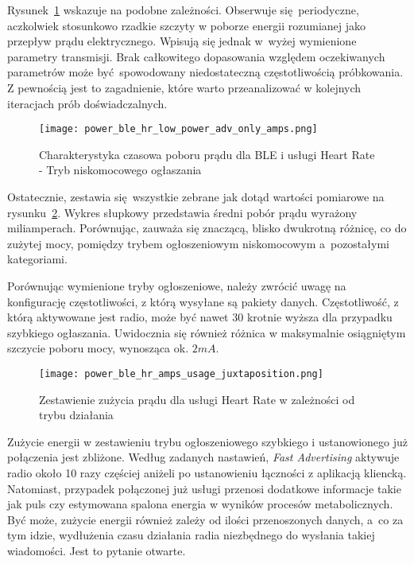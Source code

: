 Rysunek~\ref{rys:power_ble_hr_low_power_adv_only_amps} wskazuje na podobne zależności. Obserwuje się periodyczne, aczkolwiek
stosunkowo rzadkie szczyty w poborze energii rozumianej jako przepływ prądu elektrycznego. Wpisują się jednak w~wyżej wymienione
parametry transmisji. Brak całkowitego dopasowania względem oczekiwanych parametrów może być spowodowany niedostateczną
częstotliwością próbkowania. Z pewnością jest to zagadnienie, które warto przeanalizować w kolejnych iteracjach prób doświadczalnych.


\begin{figure}[!ht]
	\centering \texttt{[image: power\_ble\_hr\_low\_power\_adv\_only\_amps.png]}
	\caption{Charakterystyka czasowa poboru prądu dla BLE i usługi Heart Rate - Tryb niskomocowego ogłaszania}
	\label{rys:power_ble_hr_low_power_adv_only_amps}
\end{figure}

Ostatecznie, zestawia się wszystkie zebrane jak dotąd wartości pomiarowe na rysunku~\ref{rys:power_ble_hr_amps_usage_juxtaposition}.
Wykres słupkowy przedstawia średni pobór prądu wyrażony miliamperach. Porównując, zauważa się znaczącą, blisko dwukrotną
różnicę, co do zużytej mocy, pomiędzy trybem ogłoszeniowym niskomocowym a~pozostałymi kategoriami.

Porównując wymienione tryby ogłoszeniowe, należy zwrócić uwagę na konfigurację częstotliwości, z którą wysyłane są
pakiety danych. Częstotliwość, z którą aktywowane jest radio, może być nawet 30 krotnie wyższa dla przypadku szybkiego ogłaszania.
Uwidocznia się również różnica w maksymalnie osiągniętym szczycie poboru mocy, wynosząca ok. $2mA$.

\begin{figure}[!ht]
	\centering \texttt{[image: power\_ble\_hr\_amps\_usage\_juxtaposition.png]}
	\caption{Zestawienie zużycia prądu dla usługi Heart Rate w zależności od trybu działania}
	\label{rys:power_ble_hr_amps_usage_juxtaposition}
\end{figure}

Zużycie energii w zestawieniu trybu ogłoszeniowego szybkiego i ustanowionego już połączenia jest zbliżone. Według zadanych nastawień,
\textit{Fast Advertising} aktywuje radio około 10 razy częściej aniżeli po ustanowieniu łączności z aplikacją kliencką. Natomiast,
przypadek połączonej już usługi przenosi dodatkowe informacje takie jak puls czy estymowana spalona energia w wyników procesów
metabolicznych. Być może, zużycie energii również zależy od ilości przenoszonych danych, a~co za tym idzie, 
wydłużenia czasu działania radia niezbędnego do wysłania takiej wiadomości. Jest to pytanie otwarte.

